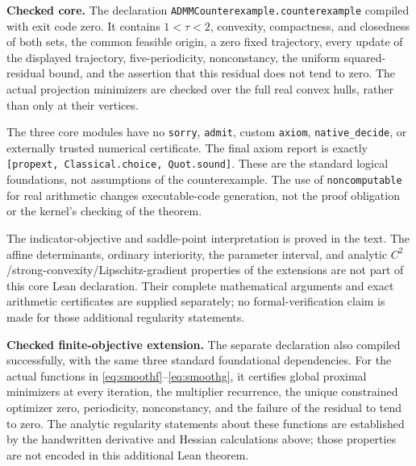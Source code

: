 \noindent\textbf{Checked core.} The declaration \texttt{ADMMCounterexample.counterexample} compiled with exit code zero. It contains $1<\tau<2$, convexity, compactness, and closedness of both sets, the common feasible origin, a zero fixed trajectory, every update of the displayed trajectory, five-periodicity, nonconstancy, the uniform squared-residual bound, and the assertion that this residual does not tend to zero. The actual projection minimizers are checked over the full real convex hulls, rather than only at their vertices.

The three core modules have no \texttt{sorry}, \texttt{admit}, custom \texttt{axiom}, \texttt{native\_decide}, or externally trusted numerical certificate. The final axiom report is exactly \texttt{[propext, Classical.choice, Quot.sound]}. These are the standard logical foundations, not assumptions of the counterexample. The use of \texttt{noncomputable} for real arithmetic changes executable-code generation, not the proof obligation or the kernel's checking of the theorem.

The indicator-objective and saddle-point interpretation is proved in the text. The affine determinants, ordinary interiority, the parameter interval, and analytic $C^2$/strong-convexity/Lipschitz-gradient properties of the extensions are not part of this core Lean declaration. Their complete mathematical arguments and exact arithmetic certificates are supplied separately; no formal-verification claim is made for those additional regularity statements.

\noindent\textbf{Checked finite-objective extension.} The separate declaration  also compiled successfully, with the same three standard foundational dependencies. For the actual functions in \eqref{eq:smoothf}--\eqref{eq:smoothg}, it certifies global proximal minimizers at every iteration, the multiplier recurrence, the unique constrained optimizer zero, periodicity, nonconstancy, and the failure of the residual to tend to zero. The analytic regularity statements about these functions are established by the handwritten derivative and Hessian calculations above; those properties are not encoded in this additional Lean theorem.
